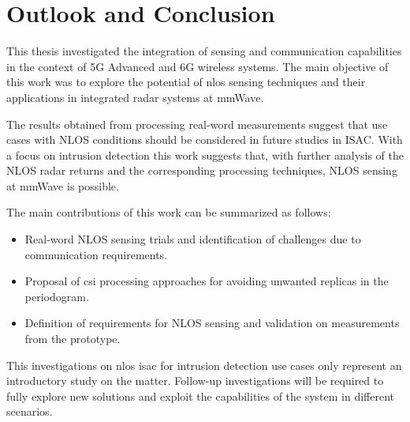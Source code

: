 \chapter{Outlook and Conclusion}

This thesis investigated the integration of sensing and communication capabilities in the context of 5G Advanced and 6G wireless systems. 
The main objective of this work was to explore the potential of \gls{nlos} sensing techniques and their applications in integrated radar systems at mmWave. 

The results obtained from processing real-word measurements suggest that use cases with NLOS conditions should be considered in future studies in ISAC.
With a focus on intrusion detection this work suggests that, with further analysis of the NLOS radar returns and the corresponding processing techniques, NLOS sensing at mmWave is possible.

The main contributions of this work can be summarized as follows:

\begin{itemize}
	\item Real-word NLOS sensing trials and identification of challenges due to communication requirements.
	\item Proposal of \gls{csi} processing approaches for avoiding unwanted replicas in the periodogram.
	\item Definition of requirements for NLOS sensing and validation on measurements from the prototype.
\end{itemize}

This investigations on \gls{nlos} \gls{isac} for intrusion detection use cases only represent an introductory study on the matter.
Follow-up investigations will be required to fully explore new solutions and exploit the capabilities of the system in different scenarios.
